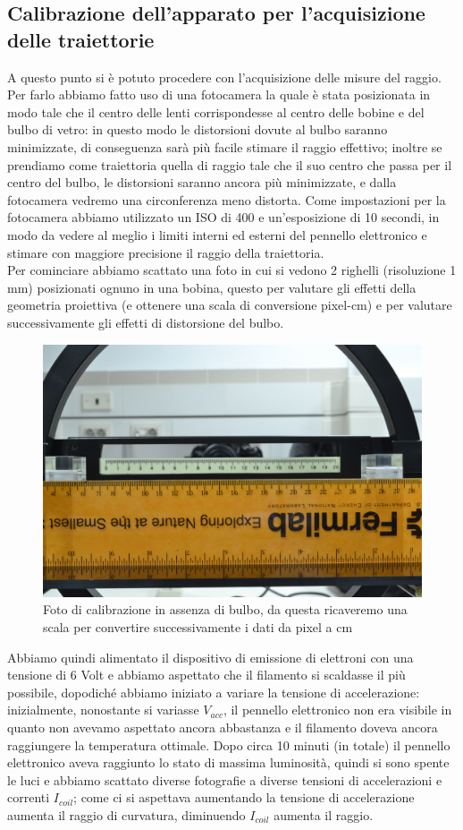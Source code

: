 \documentclass[10pt, a4paper, italian]{article}
\begin{document}
\subsection{Calibrazione dell'apparato per l'acquisizione delle traiettorie}
\label{sec: conv}
A questo punto si è potuto procedere con l'acquisizione delle misure del raggio.
Per farlo abbiamo fatto uso di una fotocamera la quale è stata posizionata in modo tale che il centro delle lenti corrispondesse al centro delle bobine e del bulbo di vetro: in questo modo le distorsioni dovute al bulbo saranno minimizzate, di conseguenza sarà più facile stimare il raggio effettivo; inoltre se prendiamo come traiettoria quella di raggio tale che il suo centro che passa per il centro del bulbo, le distorsioni saranno ancora più minimizzate, e dalla fotocamera vedremo una circonferenza meno distorta.
Come impostazioni per la fotocamera abbiamo utilizzato un ISO di 400 e un'esposizione di 10 secondi, in modo da vedere al meglio i limiti interni ed esterni del pennello elettronico e stimare con maggiore precisione il raggio della traiettoria.\\
Per cominciare abbiamo scattato una foto in cui si vedono 2 righelli (risoluzione 1 mm) posizionati ognuno in una bobina, questo per valutare gli effetti della geometria proiettiva (e ottenere una scala di conversione pixel-cm) e per valutare successivamente gli effetti di distorsione del bulbo.
\begin{figure}
\includegraphics[width=\textwidth]{cal1}
\caption{Foto di calibrazione in assenza di bulbo, da questa ricaveremo una scala per convertire successivamente i dati da pixel a cm}
\end{figure}
Abbiamo quindi alimentato il dispositivo di emissione di elettroni con una tensione di 6 Volt e abbiamo aspettato che il filamento si scaldasse il più possibile, dopodiché abbiamo iniziato a variare la tensione di accelerazione: inizialmente, nonostante si variasse $V_{acc}$, il pennello elettronico non era visibile in quanto non avevamo aspettato ancora abbastanza e il filamento doveva ancora raggiungere la temperatura ottimale. Dopo circa 10 minuti (in totale) il pennello elettronico aveva raggiunto lo stato di massima luminosità, quindi si sono spente le luci e abbiamo scattato diverse fotografie a diverse tensioni di accelerazioni e correnti $I_{coil}$; come ci si aspettava aumentando la tensione di accelerazione aumenta il raggio di curvatura, diminuendo $I_{coil}$ aumenta il raggio.
\end{document}
